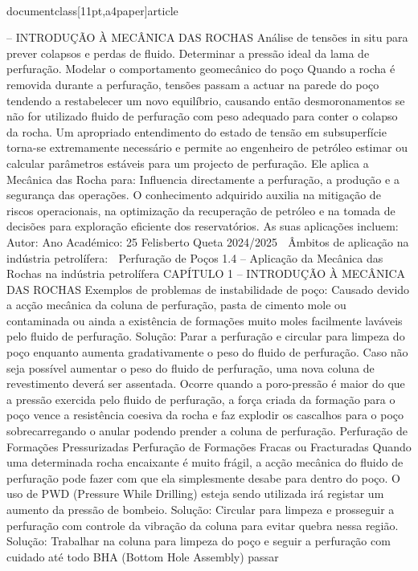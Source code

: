 \\documentclass[11pt,a4paper]{article}
\begin{document}
–
 INTRODUÇÃO À MECÂNICA DAS ROCHAS
Análise de tensões in situ para prever colapsos e perdas de fluido.
Determinar a pressão ideal da lama de perfuração.
Modelar o comportamento geomecânico do poço
Quando a rocha é removida durante a perfuração, tensões passam a actuar na parede do poço tendendo a restabelecer um 
novo equilíbrio, causando então desmoronamentos se não for utilizado fluido de perfuração com peso adequado para conter 
o colapso da rocha. Um apropriado entendimento do estado de tensão em subsuperfície torna-se extremamente necessário 
e permite ao engenheiro de petróleo estimar ou calcular parâmetros estáveis para um projecto de perfuração. Ele aplica a 
Mecânica das Rocha para:
Influencia directamente a perfuração, a produção e a segurança das operações. O conhecimento adquirido auxilia
na mitigação de riscos operacionais, na optimização da recuperação de petróleo e na tomada de decisões para
exploração eficiente dos reservatórios. As suas aplicações incluem:
Autor:
Ano Académico:
25
Felisberto Queta
2024/2025

 Âmbitos de aplicação na indústria petrolífera:
 Perfuração de Poços
1.4 – Aplicação da Mecânica das Rochas na indústria petrolífera
CAPÍTULO 1 
–
 INTRODUÇÃO À MECÂNICA DAS ROCHAS
Exemplos de problemas de instabilidade de poço:
Causado devido a acção mecânica 
da coluna de perfuração, pasta de 
cimento mole ou contaminada ou 
ainda a existência de formações 
muito moles facilmente laváveis pelo 
fluido de perfuração.
Solução: Parar a perfuração e circular 
para limpeza do poço enquanto aumenta 
gradativamente o peso do fluido de 
perfuração. Caso não seja possível 
aumentar o peso do fluido de perfuração, 
uma nova coluna de revestimento deverá 
ser assentada.
Ocorre quando a poro-pressão é maior do 
que a pressão exercida pelo fluido de 
perfuração, a força criada da formação 
para o poço vence a resistência coesiva da 
rocha e faz explodir os cascalhos para o 
poço sobrecarregando o anular podendo 
prender a coluna de perfuração.
Perfuração de
Formações
Pressurizadas
Perfuração de
Formações
Fracas ou
Fracturadas
Quando uma determinada rocha encaixante 
é muito frágil, a acção mecânica do fluido de 
perfuração pode fazer com que ela 
simplesmente desabe para dentro do poço. 
O uso de PWD (Pressure While Drilling) 
esteja sendo utilizada irá registar um 
aumento da pressão de bombeio.
Solução: Circular para limpeza e prosseguir 
a perfuração com controle da vibração da 
coluna para evitar quebra nessa região.
Solução: Trabalhar na coluna para 
limpeza do poço e seguir a 
perfuração com cuidado até todo 
BHA (Bottom Hole Assembly) passar 
\end{document}
